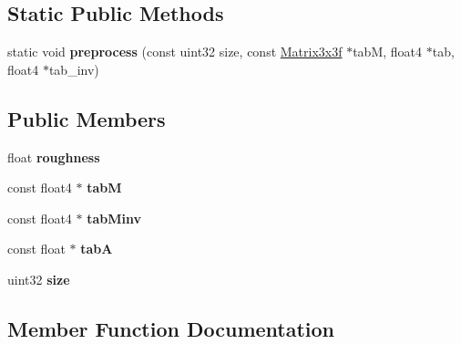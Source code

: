 \subsection*{Static Public Methods}
\begin{DoxyCompactItemize}
\item 
\mbox{\label{structcugar_1_1_l_t_c_bsdf_aebfc884e61168e078af700d50a068f5e}} 
static void {\bfseries preprocess} (const uint32 size, const \hyperlink{structcugar_1_1_matrix}{Matrix3x3f} $\ast$tabM, float4 $\ast$tab, float4 $\ast$tab\+\_\+inv)
\end{DoxyCompactItemize}
\subsection*{Public Members}
\begin{DoxyCompactItemize}
\item 
\mbox{\label{structcugar_1_1_l_t_c_bsdf_a6563aa21a39484e78e8109552d39199a}} 
float {\bfseries roughness}
\item 
\mbox{\label{structcugar_1_1_l_t_c_bsdf_ae40fa40c4c17ca710839bb2b0496b277}} 
const float4 $\ast$ {\bfseries tabM}
\item 
\mbox{\label{structcugar_1_1_l_t_c_bsdf_ab5eb73967a24a42a56eb080c85f43040}} 
const float4 $\ast$ {\bfseries tab\+Minv}
\item 
\mbox{\label{structcugar_1_1_l_t_c_bsdf_aaf272deaf65ee329756833fece178bff}} 
const float $\ast$ {\bfseries tabA}
\item 
\mbox{\label{structcugar_1_1_l_t_c_bsdf_ab55d7352189796b29dbfc7e8701f8e44}} 
uint32 {\bfseries size}
\end{DoxyCompactItemize}


\subsection{Member Function Documentation}
\mbox{\label{structcugar_1_1_l_t_c_bsdf_a17cf80e7ca7bc8d41108bb11d4b53513}} 
